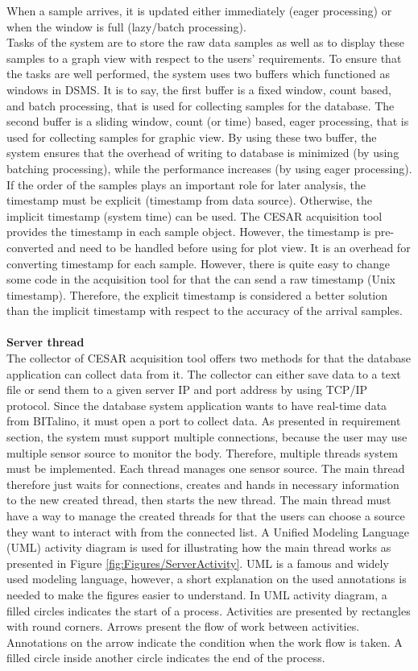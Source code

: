 When a sample arrives, it is updated either immediately (eager processing) or when the window is full (lazy/batch processing).\\
Tasks of the system are to store the raw data samples as well as to display these samples to a graph view with respect to the users’ requirements. To ensure that the tasks are well performed, the system uses two buffers which functioned as windows in DSMS. It is to say, the first buffer is a fixed window, count based, and batch processing, that is used for collecting samples for the database. The second buffer is a sliding window, count (or time) based, eager processing, that is used for collecting samples for graphic view. By using these two buffer, the system ensures that the overhead of writing to database is minimized (by using batching processing), while the performance increases (by using eager processing).\\
If the order of the samples plays an important role for later analysis, the timestamp must be explicit (timestamp from data source). Otherwise, the implicit timestamp (system time) can be used. The CESAR acquisition tool provides the timestamp in each sample object. However, the timestamp is pre-converted and need to be handled before using for plot view. It is an overhead for converting timestamp for each sample. However, there is quite easy to change some code in the acquisition tool for that the can send a raw timestamp (Unix timestamp). Therefore, the explicit timestamp is considered a better solution than the implicit timestamp with respect to the accuracy of the arrival samples.\\\\
\textbf{Server thread}\\
The collector of CESAR acquisition tool offers two methods for that the database application can collect data from it. The collector can either save data to a text file or send them to a given server IP and port address by using TCP/IP protocol. Since the database system application wants to have real-time data from BITalino, it must open a port to collect data. As presented in requirement section, the system must support multiple connections, because the user may use multiple sensor source to monitor the body. Therefore, multiple threads system must be implemented. Each thread manages one sensor source. The main thread therefore just waits for connections, creates and hands in necessary information to the new created thread, then starts the new thread. The main thread must have a way to manage the created threads for that the users can choose a source they want to interact with from the connected list. A Unified Modeling Language (UML) activity diagram is used for illustrating how the main thread works as presented in Figure \ref{fig:Figures/ServerActivity}. UML is a famous and widely used modeling language, however, a short explanation on the used annotations is needed to make the figures easier to understand. In UML activity diagram, a filled circles indicates the start of a process. Activities are presented by rectangles with round corners. Arrows present the flow of work between activities. Annotations on the arrow indicate the condition when the work flow is taken. A filled circle inside another circle indicates the end of the process.\\
